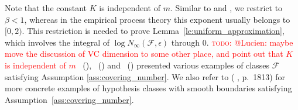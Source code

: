 \documentclass[letterpaper]{article} %
\newcommand{\complexbound}{\beta}
\newcommand{\red}[1]{\textcolor{red}{#1}}
\newcommand{\todo}[1]{\red{\textsc{todo:} #1}}
\newcommand{\citet}[1]{\citeauthor{#1}\ (\citeyear{#1})}
\begin{document}
Note that the constant $K$ is independent of $m$. 
Similar to \cite{Massart2006} and \cite{rejchel2012ranking}, we restrict to $\complexbound{} < 1$, whereas in the empirical process theory this exponent usually belongs to $[0,2)$. This restriction is needed to prove Lemma~\ref{le:uniform_approximation}, which involves the integral of $\log N_\infty(\mathcal{F},\epsilon)$ through $0$. 
\todo{@Lucien: maybe move the discussion of VC dimension to some other place, and point out that $K$ is independent of $m$}
\citet{Dudley1974Metric}, \citet{Korostelev1993Minimax} and \citet{Mammen1995Asymptotical} presented various examples of classes $\mathcal{F}$ satisfying Assumption \ref{ass:covering_number}.
We also refer to (\citeauthor{Mammen1998Smooth} \citeyear{Mammen1998Smooth}, p.\ 1813) for more concrete examples of hypothesis classes with smooth boundaries satisfying Assumption~\ref{ass:covering_number}. 
\end{document}
